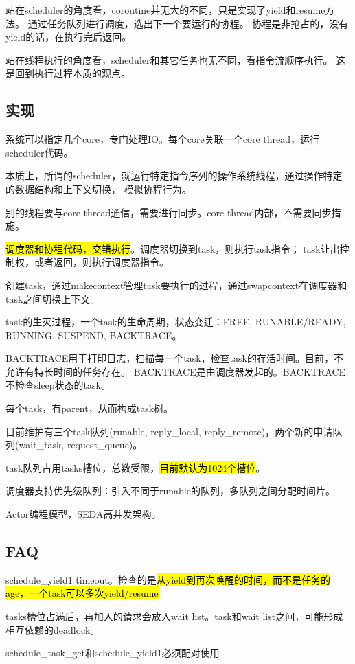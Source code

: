 站在scheduler的角度看，coroutine并无大的不同，只是实现了yield和resume方法。
通过任务队列进行调度，选出下一个要运行的协程。
协程是非抢占的，没有yield的话，在执行完后返回。

站在线程执行的角度看，scheduler和其它任务也无不同，看指令流顺序执行。
这是回到执行过程本质的观点。

\subsection{实现}

系统可以指定几个core，专门处理IO。每个core关联一个core thread，运行scheduler代码。

本质上，所谓的scheduler，就运行特定指令序列的操作系统线程，通过操作特定的数据结构和上下文切换，
模拟协程行为。

别的线程要与core thread通信，需要进行同步。core thread内部，不需要同步措施。

\hl{调度器和协程代码，交错执行}。调度器切换到task，则执行task指令；
task让出控制权，或者返回，则执行调度器指令。

创建task，通过makecontext管理task要执行的过程，通过swapcontext在调度器和task之间切换上下文。

task的生灭过程，一个task的生命周期，状态变迁：FREE, RUNABLE/READY, RUNNING, SUSPEND, BACKTRACE。

BACKTRACE用于打印日志，扫描每一个task，检查task的存活时间。目前，不允许有特长时间的任务存在。
BACKTRACE是由调度器发起的。BACKTRACE不检查sleep状态的task。

每个task，有parent，从而构成task树。

目前维护有三个task队列(runable, reply\_local, reply\_remote)，两个新的申请队列(wait\_task, request\_queue)。

task队列占用tasks槽位，总数受限，\hl{目前默认为1024个槽位}。

调度器支持优先级队列：引入不同于runable的队列，多队列之间分配时间片。

Actor编程模型，SEDA高并发架构。

\subsection{FAQ}

\begin{compactenum}
\item schedule\_yield1 timeout。检查的是\hl{从yield到再次唤醒的时间，而不是任务的age，一个task可以多次yield/resume}
\item tasks槽位占满后，再加入的请求会放入wait list。task和wait list之间，可能形成相互依赖的deadlock。
\item schedule\_task\_get和schedule\_yield1必须配对使用
\end{compactenum}

